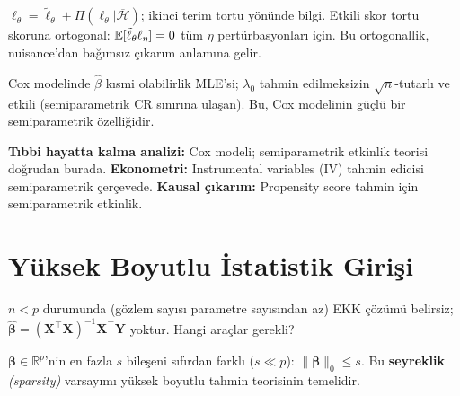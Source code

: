\begin{ispatiskele}
$\ell_\theta = \tilde\ell_\theta + \Pi(\ell_\theta|\overline{\mathcal{H}})$; ikinci terim tortu yönünde bilgi. Etkili skor tortu skoruna ortogonal: $\mathbb{E}[\tilde\ell_\theta\ell_\eta]=0$ tüm $\eta$ pertürbasyonları için. Bu ortogonallik, nuisance'dan bağımsız çıkarım anlamına gelir.
\end{ispatiskele}

\begin{ornek}
Cox modelinde $\hat\beta$ kısmi olabilirlik MLE'si; $\lambda_0$ tahmin edilmeksizin $\sqrt{n}$-tutarlı ve etkili (semiparametrik CR sınırına ulaşan). Bu, Cox modelinin güçlü bir semiparametrik özelliğidir.
\end{ornek}

\begin{disiplinlerarasibaglan}
\textbf{Tıbbi hayatta kalma analizi:} Cox modeli; semiparametrik etkinlik teorisi doğrudan burada. \textbf{Ekonometri:} Instrumental variables (IV) tahmin edicisi semiparametrik çerçevede. \textbf{Kausal çıkarım:} Propensity score tahmin için semiparametrik etkinlik.
\end{disiplinlerarasibaglan}

\section{Yüksek Boyutlu İstatistik Girişi}
\label{sec:yuksek_boyut}

\begin{kesif}
$n<p$ durumunda (gözlem sayısı parametre sayısından az) EKK çözümü belirsiz; $\hat{\boldsymbol\beta}=(\mathbf{X}^\top\mathbf{X})^{-1}\mathbf{X}^\top\mathbf{Y}$ yoktur. Hangi araçlar gerekli?
\end{kesif}

\begin{tanim}\label{def:seyreklik}
$\boldsymbol\beta\in\mathbb{R}^p$'nin en fazla $s$ bileşeni sıfırdan farklı ($s\ll p$): $\|\boldsymbol\beta\|_0\leq s$. Bu \textbf{seyreklik} \emph{(sparsity)} varsayımı yüksek boyutlu tahmin teorisinin temelidir.
\end{tanim}

